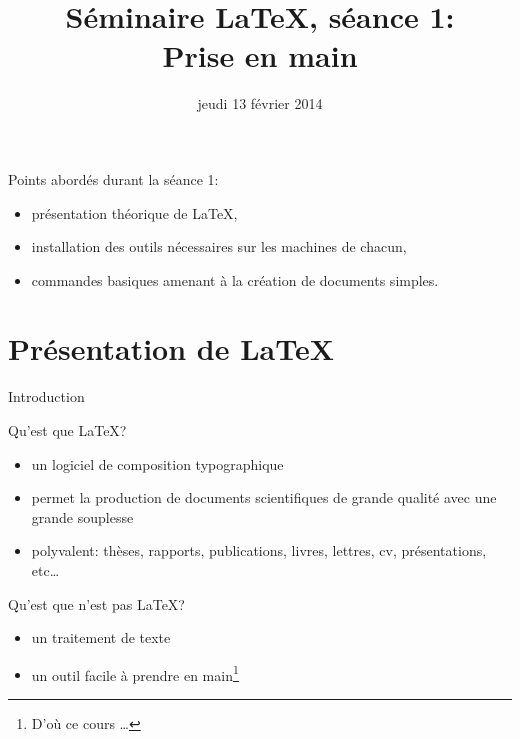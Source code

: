 \documentclass{beamer}
\title[Séminaire \LaTeX, séance 1]{Séminaire \LaTeX, séance 1:\\ Prise en main}
\date{jeudi 13 février 2014}
\begin{document}

\begin{frame}
    \titlepage
\end{frame}


\begin{frame}{Points abordés durant la séance 1:}
    \begin{itemize}
            \item présentation théorique de \LaTeX,
            \item installation des outils nécessaires sur les machines de chacun,
            \item commandes basiques amenant à la création de documents simples. 
        \end{itemize}
\end{frame}




\section{Présentation de \LaTeX} 


\begin{frame}{Introduction}
    \begin{block}{Qu'est que \LaTeX?}
        \begin{itemize}
            \item un logiciel de composition typographique
            \item permet la production de documents scientifiques de grande qualité avec une grande souplesse
            \item polyvalent: thèses, rapports, publications, livres, lettres, cv, présentations, etc\dots
        \end{itemize}
    \end{block}
    \begin{block}{Qu'est que n'est pas \LaTeX?}
        \begin{itemize}
            \item un traitement de texte
            \item un outil facile à prendre en main\footnote{D'où ce cours \dots}
        \end{itemize}
    \end{block}
\end{frame}
\end{document}
